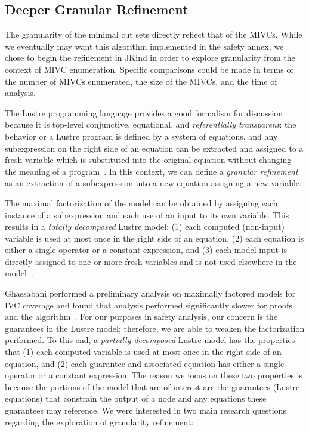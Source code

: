 \subsection{Deeper Granular Refinement}
\label{sec:granularityFRESHAlg}
The granularity of the minimal cut sets directly reflect that of the MIVCs. While we eventually may want this algorithm implemented in the safety annex, we chose to begin the refinement in JKind in order to explore granularity from the context of MIVC enumeration. Specific comparisons could be made in terms of the number of MIVCs enumerated, the size of the MIVCs, and the time of analysis. 

The Lustre programming language provides a good formalism for discussion because it is top-level conjunctive, equational, and \emph{referentially transparent}: the behavior or a Lustre program is defined by a system of equations, and any subexpression on the right side of an equation can be extracted and assigned to a fresh variable which is substituted into the original equation without changing the meaning of a program~\cite{Halbwachs91:IEEE,ghassabani_2018}. In this context, we can define a \emph{granular refinement} as an extraction of a subexpression into a new equation assigning a new variable. 

The maximal factorization of the model can be obtained by assigning each instance of a subexpression and each use of an input to its own variable. This results in a \emph{totally decomposed} Lustre model: (1) each computed (non-input) variable is used at most once in the right side of an equation, (2) each equation is either a single operator or a constant expression, and (3) each model input is directly assigned to one or more fresh variables and is not used elsewhere in the model~\cite{ghassabani_2018}.

Ghassabani performed a preliminary analysis on maximally factored models for IVC coverage and found that analysis performed significantly slower for proofs and the \ivcmust algorithm~\cite{ghassabani_2018}. For our purposes in safety analysis, our concern is the guarantees in the Lustre model; therefore, we are able to weaken the factorization performed. To this end, a \emph{partially decomposed} Lustre model has the properties that (1) each computed variable is used at most once in the right side of an equation, and (2) each guarantee and associated equation has either a single operator or a constant expression. The reason we focus on these two properties is because the portions of the model that are of interest are the guarantees (Lustre equations) that constrain the output of a node and any equations these guarantees may reference. We were interested in two main research questions regarding the exploration of granularity refinement: 

